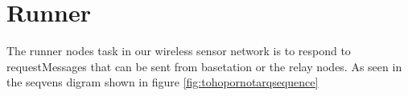 \section{Runner}\label{sc:runner}
The runner nodes task in our wireless sensor network is to respond to requestMessages that can be sent from basetation or the relay nodes. As seen in the seqvens digram shown in figure \ref{fig:tohopornotarqsequence}